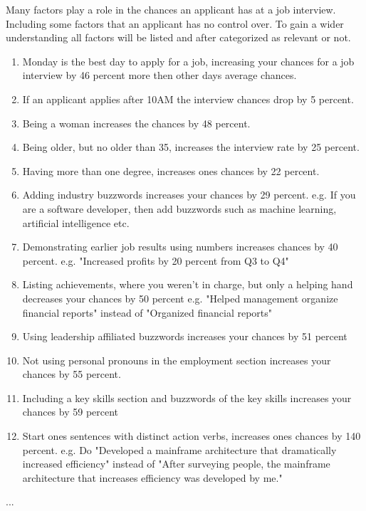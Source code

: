 Many factors play a role in the chances an applicant has at a job interview.
Including some factors that an applicant has no control over.
To gain a wider understanding all factors will be listed and after categorized as relevant or not. \\

\begin{enumerate}
   \item Monday is the best day to apply for a job, increasing your chances for a job interview by 46 percent more then other days average chances.
   \item If an applicant applies after 10AM the interview chances drop by 5 percent.
   \item Being a woman increases the chances by 48 percent.
   \item Being older, but no older than 35, increases the interview rate by 25 percent.
   \item Having more than one degree, increases ones chances by 22 percent.
   \item Adding industry buzzwords increases your chances by 29 percent.
      e.g. If you are a software developer, then add buzzwords such as machine learning,
      artificial intelligence etc.
   \item Demonstrating earlier job results using numbers increases chances by 40 percent.
      e.g. "Increased profits by 20 percent from Q3 to Q4"
   \item Listing achievements, where you weren't in charge, but only a helping hand
    decreases your chances by 50 percent
      e.g. "Helped management organize financial reports" instead of "Organized financial reports"
   \item Using leadership affiliated buzzwords increases your chances by 51 percent
   \item Not using personal pronouns in the employment section increases your
   chances by 55 percent.
   \item Including a key skills section and buzzwords of the key skills increases your
    chances by 59 percent
   \item Start ones sentences with distinct action verbs, increases ones chances by 140 percent.
      e.g. Do "Developed a mainframe architecture that dramatically increased efficiency"
      instead of "After surveying people, the mainframe architecture that increases efficiency was
      developed by me."\cite{Science_job}
   \end{enumerate}
...
